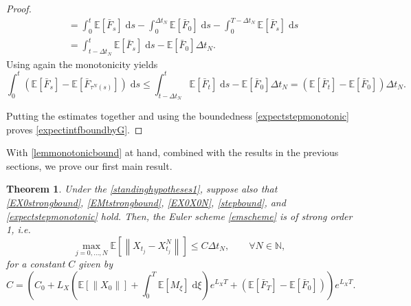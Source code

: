 \documentclass[reqno,12pt]{amsart}
\theoremstyle{plain} %
\newtheorem{theorem}{Theorem}[section]
\theoremstyle{definition} %
\begin{document}
\begin{proof}
\begin{align*}
        & = \int_0^t \mathbb{E}[\bar F_s] \;\mathrm{d}s - \int_0^{\Delta t_N} \mathbb{E}[\bar F_0]\;\mathrm{d}s - \int_{0}^{T-\Delta t_N} \mathbb{E}[\bar F_s]\;\mathrm{d}s \\
        & = \int_{t-\Delta t_N}^t \mathbb{E}[\bar F_s] \;\mathrm{d}s - \mathbb{E}[\bar F_0]\Delta t_N.
    \end{align*}
    Using again the monotonicity yields
    \[ 
      \int_0^t (\mathbb{E}[\bar F_s] - \mathbb{E}[\bar F_{\tau^N(s)}])\;\mathrm{d}s \leq \int_{t-\Delta t_N}^t \mathbb{E}[\bar F_t] \;\mathrm{d}s - \mathbb{E}[\bar F_0]\Delta t_N= (\mathbb{E}[\bar F_t] - \mathbb{E}[\bar F_0])\Delta t_N.
    \]

    Putting the estimates together and using the boundedness \eqref{expectstepmonotonic} proves \eqref{expectintfboundbyG}.
\end{proof}

With \cref{lemmonotonicbound} at hand, combined with the results in the previous sections, we prove our first main result.
\begin{theorem}
    \label{thmmonotonicbound}
    Under the \cref{standinghypotheses1}, suppose also that
    \eqref{EX0strongbound}, \eqref{EMtstrongbound}, \eqref{EX0X0N}, \eqref{stepbound}, and \eqref{expectstepmonotonic} hold. Then, the Euler scheme \eqref{emscheme} is of strong order 1, i.e.
    \begin{equation}
      \label{monotonicboundstrongordernew}
        \max_{j=0, \ldots, N}\mathbb{E}\left[ \left\| X_{t_j} - X_{t_j}^N \right\| \right] \leq C \Delta t_N, \qquad \forall N \in \mathbb{N},
    \end{equation}
    for a constant $C$ given by
    \begin{equation}
        \label{constmonotonicboundstrongordernew}
        C = \left(C_0 + L_X \left(\mathbb{E}[\|X_0\|] + \int_0^{T} \mathbb{E}[M_\xi]\;\mathrm{d}\xi\right)e^{L_X T} + (\mathbb{E}[\bar F_T] - \mathbb{E}[\bar F_0])\right)e^{L_X T}.
    \end{equation}
\end{theorem}
\end{document}

